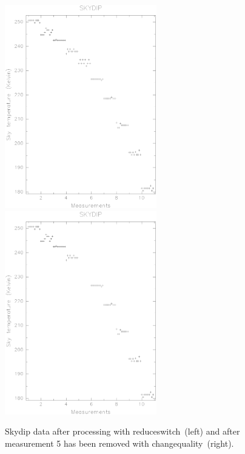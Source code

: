 \documentclass[twoside,11pt]{article}
\newcommand{\task}[1]{{\sf #1}}
\newcommand{\chgqual}{\htmlref{\task{change\_quality}}{CHANGE_QUALITY}}
\newcommand{\resw}{\htmlref{\task{reduce\_switch}}{REDUCE_SWITCH}}
\newcommand{\htmlref}[2]{#1}
\renewcommand{\_}{\texttt{\symbol{95}}}
\begin{document}
\begin{enumerate}
\begin{figure}
\begin{center}
\includegraphics[width=2.6in]{sun216_rawsdip.eps}
\includegraphics[width=2.6in]{sun216_rawsdip2.eps}
\caption{Skydip data after processing with \resw\ (left) and after measurement 
5 has been removed with \chgqual\ (right).}
\label{rawsdip}
\end{center}
\end{figure}




\end{enumerate}
\end{document}
